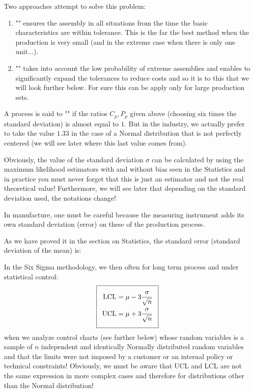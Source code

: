 Two approaches attempt to solve this problem:
	\begin{enumerate}
		\item "" ensures the assembly in all situations from the time the basic characteristics are within tolerance. This is the far the best method when the production is very small (and in the extreme case when there is only one unit...).
		\item "" takes into account the low probability of extreme assemblies and enables to significantly expand the tolerances to reduce costs and so it is to this that we will look further below. For sure this can be apply only for large production sets.
	\end{enumerate}

A process is said to "" if the ratios $C_p,P_p$ given above (choosing six times the standard deviation) is almost equal to $1$. But in the industry, we actually prefer to take  the value $1.33$  in the case of a Normal distribution that is not perfectly centered (we will see later where this last value comes from).

Obviously, the value of the standard deviation  $\sigma$  can be calculated by using the maximum likelihood estimators with and without bias seen in the Statistics and in practice you must never forget that this is just an estimator and not the real theoretical value! Furthermore, we will see later that depending on the standard deviation used, the notations change!

	\begin{tcolorbox}[title=Remark,colframe=black,arc=10pt]
In manufacture, one must be careful because the measuring instrument adds its own standard deviation (error) on these of the production process.
	\end{tcolorbox}

As we have proved it in the section on Statistics, the standard error (standard deviation of the mean) is:
	
	In the Six Sigma methodology, we then often for long term process and under statistical control:
	\begin{equation}
  \addtolength{\fboxsep}{5pt}
   \boxed{
   \begin{gathered}
		\begin{aligned}
			\text{LCL}&=\mu-3\dfrac{\sigma}{\sqrt{n}}\\
			\text{UCL}&=\mu+3\dfrac{\sigma}{\sqrt{n}}
		\end{aligned}
   \end{gathered}
   }
	\end{equation}
when we analyze control charts (see further below) whose random variables is a sample of $n$ independent and identically Normally distributed random variables and that the limits were not imposed by a customer or an internal policy or technical constraints! Obviously, we must be aware that UCL and LCL are not the same expression in more complex cases and therefore for distributions other than the Normal distribution!

